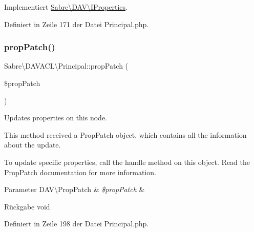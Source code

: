 Implementiert \mbox{\hyperlink{interface_sabre_1_1_d_a_v_1_1_i_properties_a0d2fcaacf74daaa5cf24ea53a057140a}{Sabre\textbackslash{}\+D\+A\+V\textbackslash{}\+I\+Properties}}.



Definiert in Zeile 171 der Datei Principal.\+php.

\mbox{\label{class_sabre_1_1_d_a_v_a_c_l_1_1_principal_ae9c9fc8afa89a3ca7fc9eb22d2d2017c}} 
\subsubsection{\texorpdfstring{prop\+Patch()}{propPatch()}}
{\footnotesize\ttfamily Sabre\textbackslash{}\+D\+A\+V\+A\+C\+L\textbackslash{}\+Principal\+::prop\+Patch (\begin{DoxyParamCaption}\item[{\mbox{\hyperlink{class_sabre_1_1_d_a_v_1_1_prop_patch}{D\+A\+V\textbackslash{}\+Prop\+Patch}}}]{\$prop\+Patch }\end{DoxyParamCaption})}

Updates properties on this node.

This method received a Prop\+Patch object, which contains all the information about the update.

To update specific properties, call the \textquotesingle{}handle\textquotesingle{} method on this object. Read the Prop\+Patch documentation for more information.


\begin{DoxyParams}[1]{Parameter}
D\+A\+V\textbackslash{}\+Prop\+Patch & {\em \$prop\+Patch} & \\
\hline
\end{DoxyParams}
\begin{DoxyReturn}{Rückgabe}
void 
\end{DoxyReturn}


Definiert in Zeile 198 der Datei Principal.\+php.

\mbox{\label{class_sabre_1_1_d_a_v_a_c_l_1_1_principal_a6274148b9a018ed90644755687c61d96}} 
